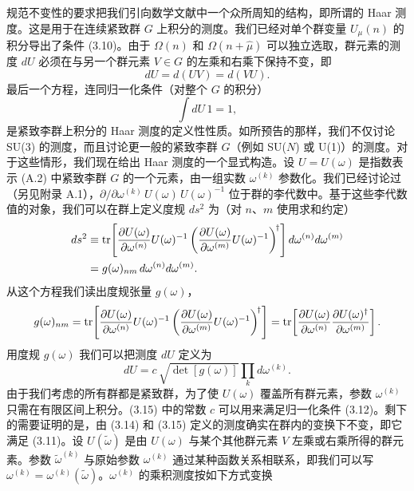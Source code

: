 规范不变性的要求把我们引向数学文献中一个众所周知的结构，即所谓的 Haar 测度。这是用于在连续紧致群 $G$ 上积分的测度。我们已经对单个群变量 $U_\mu(n)$ 的积分导出了条件 (3.10)。由于 $\Omega(n)$ 和 $\Omega(n+\hat\mu)$ 可以独立选取，群元素的测度 $dU$ 必须在与另一个群元素 $V \in G$ 的左乘和右乘下保持不变，即
\begin{equation}
  dU = d(UV) = d(VU).
\end{equation}
最后一个方程，连同归一化条件（对整个 $G$ 的积分）
\begin{equation}
  \int dU\,1 = 1,
\end{equation}
是紧致李群上积分的 Haar 测度的定义性性质。如所预告的那样，我们不仅讨论 SU(3) 的测度，而且讨论更一般的紧致李群 $G$（例如 SU($N$) 或 U(1)）的测度。对于这些情形，我们现在给出 Haar 测度的一个显式构造。设 $U = U(\omega)$ 是指数表示 (A.2) 中紧致李群 $G$ 的一个元素，由一组实数 $\omega^{(k)}$ 参数化。我们已经讨论过（另见附录 A.1），$\partial/\partial\omega^{(k)}\, U(\omega)\, U(\omega)^{-1}$ 位于群的李代数中。基于这些李代数值的对象，我们可以在群上定义度规 $ds^2$ 为（对 $n$、$m$ 使用求和约定）
\begin{equation}
  \begin{split}
    ds^2 &\equiv \operatorname{tr}\!\left[
      \frac{\partial U(\omega)}{\partial \omega^{(n)}} U(\omega)^{-1}
      \left(\frac{\partial U(\omega)}{\partial \omega^{(m)}} U(\omega)^{-1}\right)^{\!\dagger}
    \right] d\omega^{(n)} d\omega^{(m)}\\
    &= g(\omega)_{nm}\, d\omega^{(n)} d\omega^{(m)} .
  \end{split}
\end{equation}
从这个方程我们读出度规张量 $g(\omega)$，
\begin{equation}
  g(\omega)_{nm} = \operatorname{tr}\!\left[
    \frac{\partial U(\omega)}{\partial \omega^{(n)}} U(\omega)^{-1}
    \left(\frac{\partial U(\omega)}{\partial \omega^{(m)}} U(\omega)^{-1}\right)^{\!\dagger}
  \right]
  = \operatorname{tr}\!\left[
    \frac{\partial U(\omega)}{\partial \omega^{(n)}}
    \frac{\partial U(\omega)^{\dagger}}{\partial \omega^{(m)}}
  \right].
\end{equation}
用度规 $g(\omega)$ 我们可以把测度 $dU$ 定义为
\begin{equation}
  dU = c\,\sqrt{\det[g(\omega)]}\prod_k d\omega^{(k)}.
\end{equation}
由于我们考虑的所有群都是紧致群，为了使 $U(\omega)$ 覆盖所有群元素，参数 $\omega^{(k)}$ 只需在有限区间上积分。(3.15) 中的常数 $c$ 可以用来满足归一化条件 (3.12)。剩下的需要证明的是，由 (3.14) 和 (3.15) 定义的测度确实在群内的变换下不变，即它满足 (3.11)。设 $U(\tilde\omega)$ 是由 $U(\omega)$ 与某个其他群元素 $V$ 左乘或右乘所得的群元素。参数 $\tilde\omega^{(k)}$ 与原始参数 $\omega^{(k)}$ 通过某种函数关系相联系，即我们可以写 $\omega^{(k)} = \omega^{(k)}(\tilde\omega)$。$\omega^{(k)}$ 的乘积测度按如下方式变换
